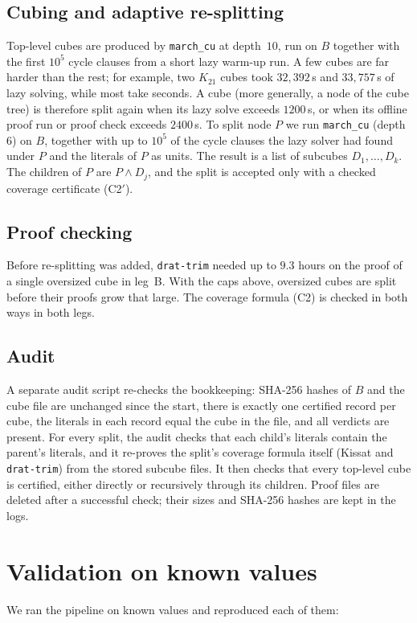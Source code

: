 \documentclass[11pt]{amsart}
\theoremstyle{definition}
\theoremstyle{remark}
\begin{document}
\subsection*{Cubing and adaptive re-splitting}
Top-level cubes are produced by \texttt{march\_cu} at depth~$10$, run on $B$ together with the first $10^5$ cycle clauses from a short
lazy warm-up run. A few cubes are far harder than the rest; for example, two $K_{21}$ cubes took $32{,}392$\,s and $33{,}757$\,s of lazy
solving, while most take seconds. A cube (more generally, a node of the cube tree) is therefore split again when its lazy solve exceeds
$1200$\,s, or when its offline proof run or proof check exceeds $2400$\,s. To split node $P$ we run \texttt{march\_cu} (depth~$6$) on
$B$, together with up to $10^5$ of the cycle clauses the lazy solver had found under $P$ and the literals of $P$ as units. The result is
a list of subcubes $D_1,\dots,D_k$. The children of $P$ are $P\wedge D_j$, and the split is accepted only with a checked coverage
certificate (C2$'$).

\subsection*{Proof checking}
Before re-splitting was added, \texttt{drat-trim} needed up to $9.3$ hours on the proof of a single oversized cube in leg~B. With the caps
above, oversized cubes are split before their proofs grow that large. The coverage formula (C2) is checked in both ways in both legs.

\subsection*{Audit}
A separate audit script re-checks the bookkeeping: SHA-256 hashes of $B$ and the cube file are unchanged since the start, there is exactly
one certified record per cube, the literals in each record equal the cube in the file, and all verdicts are present. For every split, the
audit checks that each child's literals contain the parent's literals, and it re-proves the split's coverage formula itself (Kissat and
\texttt{drat-trim}) from the stored subcube files. It then checks that every top-level cube is certified, either directly or recursively
through its children. Proof files are deleted after a successful check; their sizes and SHA-256 hashes are kept in the logs.

\section{Validation on known values}\label{app:valid}
We ran the pipeline on known values and reproduced each of them:
\end{document}
